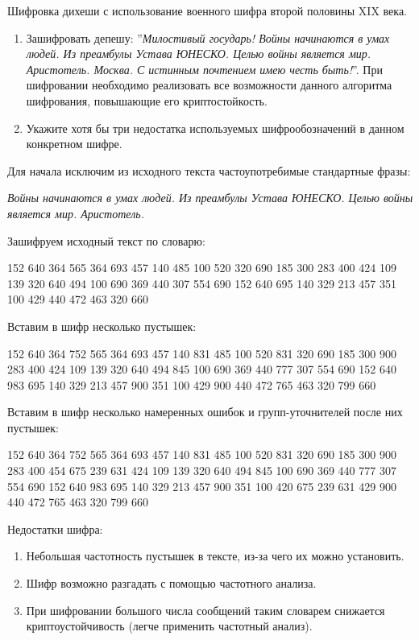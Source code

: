 \begin{problem}
  Шифровка дихеши с использование военного шифра второй половины XIX века.

  \begin{enumerate}
    \item Зашифровать депешу: ''\textit{Милостивый государь! Войны начинаются в
      умах людей. Из преамбулы Устава ЮНЕСКО. Целью войны является мир.
      Аристотель.  Москва. С истинным почтением имею честь быть!}''. При
      шифровании необходимо реализовать все возможности данного алгоритма
      шифрования, повышающие его криптостойкость.

    \item Укажите хотя бы три недостатка используемых шифрообозначений в
      данном конкретном шифре.
  \end{enumerate}
\end{problem}

\begin{solution}
  Для начала исключим из исходного текста частоупотребимые стандартные фразы:
  \begin{addmargin}[2cm]{1cm}
    \textit{Войны начинаются в умах людей. Из преамбулы Устава ЮНЕСКО. Целью
    войны является мир. Аристотель.}
  \end{addmargin}

  Зашифруем исходный текст по словарю:
  \begin{addmargin}[2cm]{1cm}
    152 640 364 565 364 693 457 140 485 100 520 320 690 185 300 283 400 424 109
    139 320 640 494 100 690 369 440 307 554 690 152 640 695 140 329 213 457 351
    100 429 440 472 463 320 660
  \end{addmargin}

  Вставим в шифр несколько пустышек:
  \begin{addmargin}[2cm]{1cm}
    152 640 364 752 565 364 693 457 140 831 485 100 520 831 320 690 185 300 900
    283 400 424 109 139 320 640 494 845 100 690 369 440 777 307 554 690 152 640
    983 695 140 329 213 457 900 351 100 429 900 440 472 765 463 320 799 660
  \end{addmargin}

  Вставим в шифр несколько намеренных ошибок и групп-уточнителей после них
  пустышек:
  \begin{addmargin}[2cm]{1cm}
    152 640 364 752 565 364 693 457 140 831 485 100 520 831 320 690 185 300 900
    283 400 454 675 239 631 424 109 139 320 640 494 845 100 690 369 440 777 307
    554 690 152 640 983 695 140 329 213 457 900 351 100 420 675 239 631 429 900
    440 472 765 463 320 799 660
  \end{addmargin}

  Недостатки шифра:
  \begin{enumerate}
    \item Небольшая частотность пустышек в тексте, из-за чего их можно
      установить.
    \item Шифр возможно разгадать с помощью частотного анализа.
    \item При шифровании большого числа сообщений таким словарем снижается
      криптоустойчивость (легче применить частотный анализ).
  \end{enumerate}
\end{solution}
